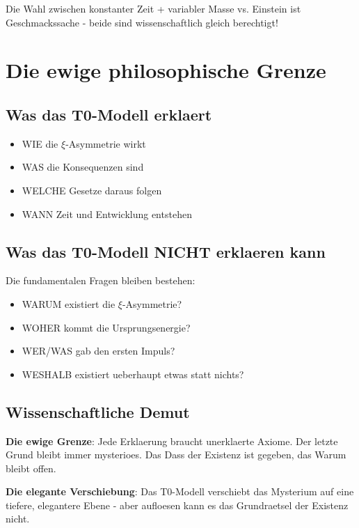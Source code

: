 \documentclass[12pt,a4paper]{article}
\newcommand{\xipar}{\xi}
\theoremstyle{definition}
\theoremstyle{remark}
\begin{document}
	Die Wahl zwischen konstanter Zeit + variabler Masse vs. Einstein ist Geschmackssache - beide sind wissenschaftlich gleich berechtigt!
	
	\section{Die ewige philosophische Grenze}
	
	\subsection{Was das T0-Modell erklaert}
	
	\begin{itemize}
		\item WIE die $\xipar$-Asymmetrie wirkt
		\item WAS die Konsequenzen sind
		\item WELCHE Gesetze daraus folgen
		\item WANN Zeit und Entwicklung entstehen
	\end{itemize}
	
	\subsection{Was das T0-Modell NICHT erklaeren kann}
	
	Die fundamentalen Fragen bleiben bestehen:
	\begin{itemize}
		\item WARUM existiert die $\xipar$-Asymmetrie?
		\item WOHER kommt die Ursprungsenergie?
		\item WER/WAS gab den ersten Impuls?
		\item WESHALB existiert ueberhaupt etwas statt nichts?
	\end{itemize}
	
	\subsection{Wissenschaftliche Demut}
	
	\textbf{Die ewige Grenze}:
	Jede Erklaerung braucht unerklaerte Axiome. Der letzte Grund bleibt immer mysterioes. Das Dass der Existenz ist gegeben, das Warum bleibt offen.
	
	\textbf{Die elegante Verschiebung}:
	Das T0-Modell verschiebt das Mysterium auf eine tiefere, elegantere Ebene - aber aufloesen kann es das Grundraetsel der Existenz nicht.
	
\end{document}
